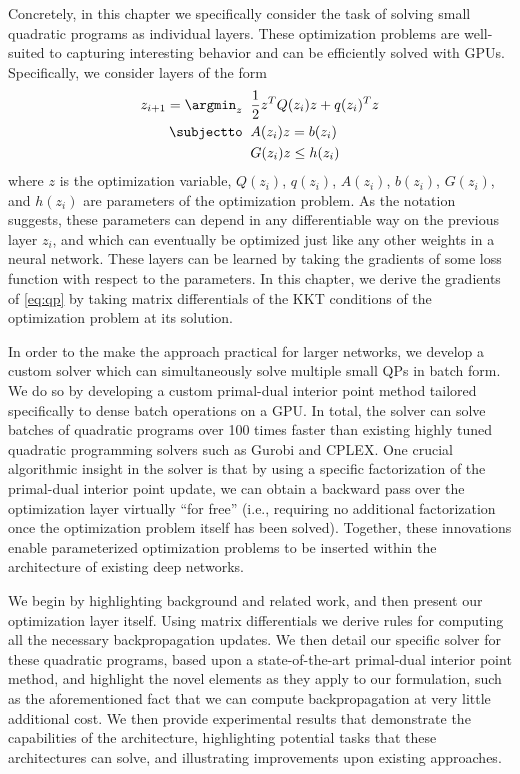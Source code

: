Concretely, in this chapter we specifically consider the task of
solving small quadratic programs as individual layers.
These optimization problems are well-suited to capturing interesting
behavior and can be efficiently solved with GPUs.
Specifically, we consider layers of the form
\begin{equation}
\begin{split}
z_{i+1} = \argmin_{z} \;\; & \frac{1} {2}z^T Q(z_i) z + q(z_i)^T z \\
\subjectto \;\; & A(z_i) z  = b(z_i) \\
& G(z_i) z \leq h(z_i)
\end{split}
\label{eq:qp}
\end{equation}
where $z$ is the optimization variable, $Q(z_i)$, $q(z_i)$, $A(z_i)$, $b(z_i)$,
$G(z_i)$, and $h(z_i)$ are parameters of the optimization problem.
As the notation suggests, these parameters can depend in any differentiable way
on the previous layer $z_i$, and which can eventually be optimized just like
any other weights in a neural network.  These layers can be learned by taking
the gradients of some loss function with respect to the parameters.
In this chapter, we derive the gradients of \eqref{eq:qp} by taking
matrix differentials of the KKT conditions of the optimization
problem at its solution.

In order to the make the approach practical for larger
networks, we develop a custom solver which can simultaneously solve multiple
small QPs in batch form.  We do so by developing a custom primal-dual
interior point method tailored specifically to dense batch operations on a GPU.
In total, the solver can solve batches of quadratic programs over 100 times
faster than
existing highly tuned quadratic programming solvers such as Gurobi and CPLEX.
One crucial algorithmic insight in the solver is that by using a
specific factorization of the primal-dual interior point update, we can obtain a
backward pass over the optimization layer virtually ``for free''
(i.e., requiring no additional factorization once the optimization problem itself
has been solved).
Together, these innovations enable parameterized optimization problems
to be inserted within the architecture of existing deep networks.

We begin by highlighting background and related work, and then present our
optimization layer itself.  Using matrix differentials we derive rules for
computing all the necessary backpropagation updates.  We then detail our
specific solver for these quadratic programs, based upon a
state-of-the-art primal-dual interior point method, and highlight the
novel elements as they apply to our formulation, such as the aforementioned fact
that we can compute backpropagation at very little additional cost.
We then provide experimental results that demonstrate the capabilities of the
architecture, highlighting potential tasks that these architectures can solve,
and illustrating improvements upon existing approaches.

